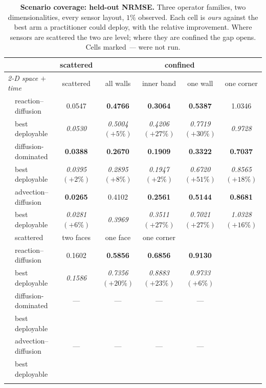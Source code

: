 \begin{table}[t]
  \centering
  \caption{\textbf{Scenario coverage: held-out NRMSE.}  Three operator families, two dimensionalities, every sensor layout, $1\%$ observed.  Each cell is \emph{ours} against the best arm a practitioner could deploy, with the relative improvement.  Where sensors are scattered the two are level; where they are confined the gap opens.  Cells marked \emph{---} were not run.}
  \label{tab:coverage}
  \small
  \begin{tabular}{llccccc}
    \toprule
    & & scattered & \multicolumn{4}{c}{confined} \\
    \cmidrule(lr){3-3}\cmidrule(lr){4-7}
    \midrule
    \multicolumn{2}{l}{\emph{2-D space $+$ time}} & scattered & all walls & inner band & one wall & one corner \\
    & reaction--diffusion & 0.0547 & \textbf{0.4766} & \textbf{0.3064} & \textbf{0.5387} & 1.0346 \\
    & \scriptsize best deployable & \scriptsize \emph{0.0530} & \scriptsize \emph{0.5004} \scriptsize$(+5\%)$ & \scriptsize \emph{0.4206} \scriptsize$(+27\%)$ & \scriptsize \emph{0.7719} \scriptsize$(+30\%)$ & \scriptsize \emph{0.9728} \\
    \addlinespace[2pt]
    & diffusion-dominated & \textbf{0.0388} & \textbf{0.2670} & \textbf{0.1909} & \textbf{0.3322} & \textbf{0.7037} \\
    & \scriptsize best deployable & \scriptsize \emph{0.0395} \scriptsize$(+2\%)$ & \scriptsize \emph{0.2895} \scriptsize$(+8\%)$ & \scriptsize \emph{0.1947} \scriptsize$(+2\%)$ & \scriptsize \emph{0.6720} \scriptsize$(+51\%)$ & \scriptsize \emph{0.8565} \scriptsize$(+18\%)$ \\
    \addlinespace[2pt]
    & advection--diffusion & \textbf{0.0265} & 0.4102 & \textbf{0.2561} & \textbf{0.5144} & \textbf{0.8681} \\
    & \scriptsize best deployable & \scriptsize \emph{0.0281} \scriptsize$(+6\%)$ & \scriptsize \emph{0.3969} & \scriptsize \emph{0.3511} \scriptsize$(+27\%)$ & \scriptsize \emph{0.7021} \scriptsize$(+27\%)$ & \scriptsize \emph{1.0328} \scriptsize$(+16\%)$ \\
    \addlinespace[2pt]
    \midrule
    \multicolumn{2}{l}{\emph{3-D space $+$ time}} & scattered & two faces & one face & one corner &  \\
    & reaction--diffusion & 0.1602 & \textbf{0.5856} & \textbf{0.6856} & \textbf{0.9130} &  \\
    & \scriptsize best deployable & \scriptsize \emph{0.1586} & \scriptsize \emph{0.7356} \scriptsize$(+20\%)$ & \scriptsize \emph{0.8883} \scriptsize$(+23\%)$ & \scriptsize \emph{0.9733} \scriptsize$(+6\%)$ &  \\
    \addlinespace[2pt]
    & diffusion-dominated & --- & --- & --- & --- &  \\
    & \scriptsize best deployable &  &  &  &  &  \\
    \addlinespace[2pt]
    & advection--diffusion & --- & --- & --- & --- &  \\
    & \scriptsize best deployable &  &  &  &  &  \\
    \addlinespace[2pt]
    \bottomrule
  \end{tabular}
\end{table}
